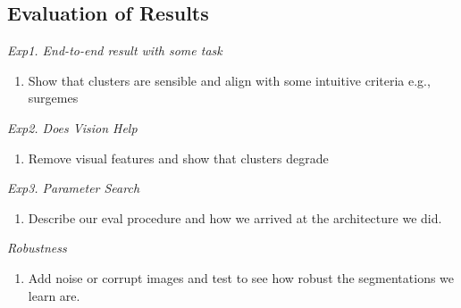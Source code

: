 \subsection{Evaluation of Results }

\noindent \textit{Exp1. End-to-end result with some task}

\begin{enumerate}
\item Show that clusters are sensible and align with some intuitive criteria e.g., surgemes
\end{enumerate}

\noindent \textit{Exp2. Does Vision Help}

\begin{enumerate}
\item Remove visual features and show that clusters degrade
\end{enumerate}

\noindent \textit{Exp3. Parameter Search}

\begin{enumerate}
\item Describe our eval procedure and how we arrived at the architecture we did.
\end{enumerate}

\noindent \textit{Robustness}
\begin{enumerate}
\item Add noise or corrupt images and test to see how robust the segmentations we learn are.
\end{enumerate}



